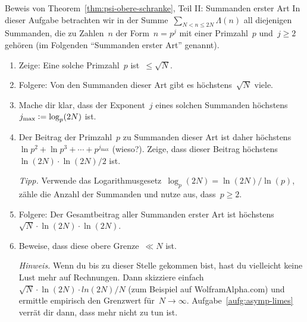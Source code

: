 \documentclass[twoside]{../zirkelblatt1415}
\theoremstyle{definition}
\theoremstyle{plain}
\theoremstyle{remark}
\newcommand{\defeq}{\vcentcolon=}
\begin{document}
\begin{aufgabe}{Beweis von Theorem~\ref{thm:psi-obere-schranke}, Teil II:
Summanden erster Art}
In dieser Aufgabe betrachten wir in der Summe~$\sum_{N < n \leq 2N} \Lambda(n)$
all diejenigen Summanden, die zu Zahlen~$n$ der Form~$n = p^j$ mit einer Primzahl~$p$
und~$j \geq 2$ gehören (im Folgenden "`Summanden erster Art"' genannt).
\begin{enumerate}
\item Zeige: Eine solche Primzahl~$p$ ist~$\leq \sqrt{N}$.
\item Folgere: Von den Summanden dieser Art gibt es höchstens~$\sqrt{N}$ viele.
\item Mache dir klar, dass der Exponent~$j$ eines solchen Summanden
höchstens~$j_\text{max} \defeq \log_p(2N)$ ist.
\item Der Beitrag der Primzahl~$p$ zu Summanden dieser Art ist daher höchstens
$\ln p^2 + \ln p^3 + \cdots + p^{j_\text{max}}$ (wieso?). Zeige, dass dieser
Beitrag höchstens $\ln(2N) \cdot \ln(2N) / 2$ ist.

\emph{Tipp.} Verwende das Logarithmusgesetz~$\log_p(2N) = \ln(2N)/\ln(p)$,
zähle die Anzahl der Summanden und nutze aus, dass~$p \geq 2$.
\item Folgere: Der Gesamtbeitrag aller Summanden erster Art ist höchstens
$\sqrt{N} \cdot \ln(2N) \cdot \ln(2N)$.
\item Beweise, dass diese obere Grenze~$\ll N$ ist.

\emph{Hinweis.} Wenn du bis zu dieser Stelle gekommen bist, hast du vielleicht
keine Lust mehr auf Rechnungen. Dann skizziere einfach~$\sqrt{N} \cdot \ln(2N)
\cdot ln(2N) / N$ (zum Beispiel auf WolframAlpha.com) und ermittle empirisch
den Grenzwert für~$N \to \infty$. Aufgabe~\ref{aufg:asymp-limes} verrät dir
dann, dass mehr nicht zu tun ist.
\end{enumerate}\fixlistspacing
\end{aufgabe}
\end{document}
